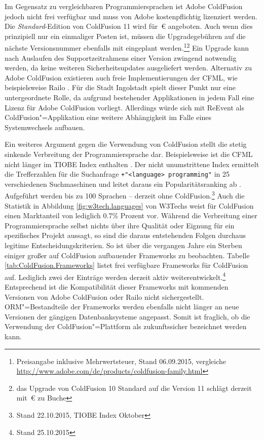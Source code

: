 Im Gegensatz zu vergleichbaren Programmiersprachen ist Adobe ColdFusion jedoch nicht frei verfügbar und muss von Adobe kostenpflichtig lizenziert werden. Die \emph{Standard}-Edition von ColdFusion 11 wird für \,€ angeboten. Auch wenn dies prinzipiell nur ein einmaliger Posten ist, müssen die Upgradegebühren auf die nächste Versionsnummer ebenfalls mit eingeplant werden.\footnote{Preisangabe inklusive Mehrwertsteuer, Stand 06.09.2015, vergleiche \url{http://www.adobe.com/de/products/coldfusion-family.html}}\footnote{das Upgrade von ColdFusion 10 Standard auf die Version 11 schlägt derzeit mit \,€ zu Buche} Ein Upgrade kann nach Auslaufen des Supportzeitrahmens einer Version zwingend notwendig werden, da keine weiteren Sicherheitsupdates ausgeliefert werden. Alternativ zu Adobe ColdFusion existieren auch freie Implementierungen der CFML, wie beispielsweise Railo \cite[Abschnitt \enquote{Inexpensive and free}]{Drew.2011}. Für die Stadt Ingolstadt spielt dieser Punkt nur eine untergeordnete Rolle, da aufgrund bestehender Applikationen in jedem Fall eine Lizenz für Adobe ColdFusion vorliegt. Allerdings würde sich mit ReEvent als ColdFusion"=Applikation eine weitere Abhängigkeit im Falle eines Systemwechsels aufbauen.

Ein weiteres Argument gegen die Verwendung von ColdFusion stellt die stetig sinkende Verbreitung der Programmiersprache dar. Beispielsweise ist die CFML nicht länger im TIOBE Index enthalten \cite{TIOBESoftwareBV.2015}. Der nicht unumstrittene Index ermittelt die Trefferzahlen für die Suchanfrage \texttt{+"{}<language> programming"{}} in 25 verschiedenen Suchmaschinen und leitet daraus ein Popularitätsranking ab \cite{MengeSonnentag.2015}. Aufgeführt werden bis zu 100 Sprachen -- derzeit ohne ColdFusion.\footnote{Stand 22.10.2015, TIOBE Index Oktober}
Auch die Statistik in Abbildung \ref{fig:w3tech.languages} von W3Techs weist für ColdFusion einen Marktanteil von lediglich 0.7\% Prozent vor.
Während die Verbreitung einer Programmiersprache selbst nichts über ihre Qualität oder Eignung für ein spezifisches Projekt aussagt, so sind die daraus entstehenden Folgen durchaus legitime Entscheidungskriterien. So ist über die vergangen Jahre ein Sterben einiger großer auf ColdFusion aufbauender Frameworks zu beobachten. Tabelle \ref{tab:ColdFusion.Frameworks} listet frei verfügbare Frameworks für ColdFusion auf. Lediglich zwei der Einträge werden derzeit aktiv weiterentwickelt.\footnote{Stand 25.10.2015} Entsprechend ist die Kompatibilität dieser Frameworks mit kommenden Versionen von Adobe ColdFusion oder Railo nicht sichergestellt. ORM"=Bestandteile der Frameworks werden ebenfalls nicht länger an neue Versionen der gängigen Datenbanksysteme angepasst. Somit ist fraglich, ob die Verwendung der ColdFusion"=Plattform als zukunftssicher bezeichnet werden kann.


